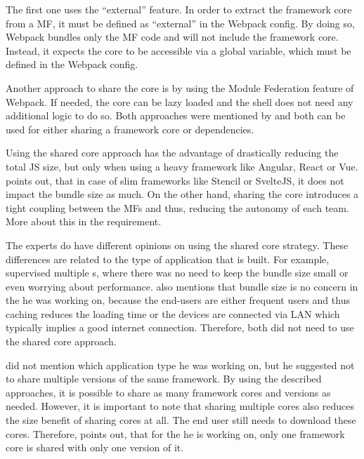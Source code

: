 The first one uses the \enquote{external} feature.
In order to extract the framework core from a \ac{MF}, it must be defined as \enquote{external} in the Webpack config.
By doing so, Webpack bundles only the \ac{MF} code and will not include the framework core.
Instead, it expects the core to be accessible via a global variable, which must be defined in the Webpack config\footnotemark{}.

Another approach to share the core is by using the Module Federation feature of Webpack.
If needed, the core can be lazy loaded and the shell does not need any additional logic to do so\footnotemark{}.
Both approaches were mentioned by \citeauthorSteyer{} and both can be used for either sharing a framework core or dependencies.

Using the shared core approach has the advantage of drastically reducing the total \ac{JS} size, but only when using a heavy framework like Angular, React or Vue.
\textcite{Leitner.2020} points out, that in case of slim frameworks like Stencil or SvelteJS, it does not impact the bundle size as much.
On the other hand, sharing the core introduces a tight coupling between the \acp{MF} and thus, reducing the autonomy of each team.
More about this in the \textit{} requirement.

The experts do have different opinions on using the shared core strategy.
These differences are related to the type of application that is built.
For example, \textciteSteyer{} supervised multiple s, where there was no need to keep the bundle size small or even worrying about performance.
\textcite{Laug.2018} also mentions that bundle size is no concern in the  he was working on, because the end-users are either frequent users and thus caching reduces the loading time or the devices are connected via \ac{LAN} which typically implies a good internet connection.
Therefore, both did not need to use the shared core approach.

\textcite{Dornenburg.2019} did not mention which application type he was working on, but he suggested not to share multiple versions of the same framework.
By using the described approaches, it is possible to share as many framework cores and versions as needed.
However, it is important to note that sharing multiple cores also reduces the size benefit of sharing cores at all.
The end user still needs to download these cores.
Therefore, \textcite{Grijzen.2019} points out, that for the  he is working on, only one framework core is shared with only one version of it.

